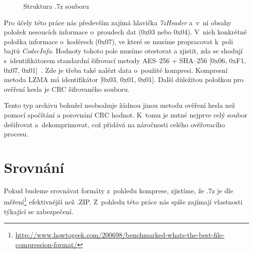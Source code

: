 \begin{figure}[ht]
    \begin{center}
    \end{center}
    \caption{Struktura .7z souboru \cite{Pavlov:2015}}
    \label{7zstruct}
\end{figure}
Pro účely této práce nás především zajímá hlavička {\it 7zHeader} a~v~ní obsahy položek nesoucích
informace o~proudech dat (0x03 nebo 0x04). V~nich konkrétně položka informace o~kodérech (0x07),
ve které se musíme propracovat k~poli bajtů {\it CodecInfo}. Hodnoty tohoto pole musíme otestovat
a zjistit, zda se shodují s~identifikátorem standardní šifrovací metody AES--256 + SHA--256
[0x06, 0xF1, 0x07, 0x01]~\cite{Pavlov:2015}. Zde je třeba také nalézt data o~použité kompresi.
Kompresní metoda LZMA má identifikátor [0x03, 0x01, 0x01]. Další důležitou položkou pro ověření
hesla je CRC šifrovaného souboru.

Tento typ archivu bohužel neobsahuje žádnou jinou metodu ověření hesla než pomocí spočítání a
porovnání CRC hodnot. K~tomu je nutné nejprve celý soubor dešifrovat a~dekomprimovat, což přidává
na náročnosti celého ověřovacího procesu.

\section{Srovnání}
Pokud budeme srovnávat formáty z~pohledu komprese, zjistíme, že .7z je dle
měření\footnote{\url{http://www.howtogeek.com/200698/benchmarked-whats-the-best-file-compression-format/}}
efektivnější než .ZIP. Z~pohledu této práce nás spíše zajímají vlastnosti týkající se zabezpečení.

